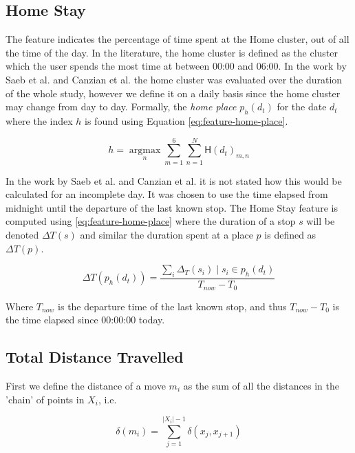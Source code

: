 \subsection{Home Stay}
The  feature indicates the percentage of time spent at the Home cluster, out of all the time of the day. In the literature, the home cluster is defined as the cluster which the user spends the most time at between 00:00 and 06:00. In the work by Saeb et al. and Canzian et al. \cite{Saeb2015, saeb2016, Canzian2015} the home cluster was evaluated over the duration of the whole study, however we define it on a daily basis since the home cluster may change from day to day. Formally, the \textit{home place} $p_h (d_t)$ for the date $d_t$ where the index $h$ is found using Equation \eqref{eq:feature-home-place}.

\begin{equation}
\label{eq:feature-home-place}
h = \operatorname*{argmax}_n \sum_{m=1}^{6} \sum_{n=1}^{N}  \mathsf{H}(d_t)_{m,n}
\end{equation}

In the work by Saeb et al. \cite{Saeb2015} and Canzian et al.\cite{Canzian2015} it is not stated how this would be calculated for an incomplete day. It was chosen to  use the time elapsed from midnight until the departure of the last known stop. The Home Stay feature is computed using \eqref{eq:feature-home-place} where the duration of a stop $s$ will be denoted $\Delta T (s)$ and similar the duration spent at a place $p$ is defined as $\Delta T (p)$.

\begin{equation}
\label{eq:feature-home-place}
\Delta T(p_{h} (d_t) )= \frac{\sum_i \Delta_T (s_i) \;|\; s_i \in p_h (d_t)}{T_{now} - T_{0}}
\end{equation}

Where $T_{now}$ is the departure time of the last known stop, and thus $T_{now} - T_0$ is the time elapsed since 00:00:00 today.

\subsection{Total Distance Travelled}
First we define the distance of a move $m_i$ as the sum of all the distances in the 'chain' of points in $X_i$, i.e.

\begin{equation}
\label{eq:feature-move-computation}
\delta (m_i)  = \sum_{j=1}^{|X_i|-1} \delta (x_j, x_{j+1})
\end{equation}

